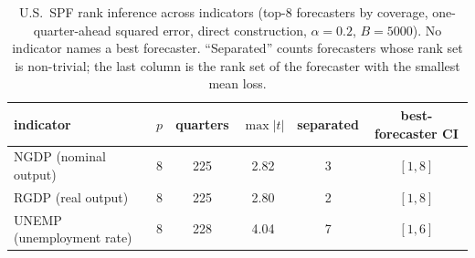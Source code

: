 \begin{table}[htb]
  \centering
  \caption[SPF rank inference across indicators]{U.S.\ SPF rank inference across
  indicators (top-8 forecasters by coverage, one-quarter-ahead squared error, direct
  construction, $\alpha=0.2$, $B=5000$). No indicator names a best forecaster.
  ``Separated'' counts forecasters whose rank set is non-trivial; the last column is the
  rank set of the forecaster with the smallest mean loss.}
  \label{tab:spf-indicators}
  \small
  \begin{tabular}{lccccc}
    \toprule
    indicator & $p$ & quarters & $\max|t|$ & separated & best-forecaster CI\\
    \midrule
    NGDP (nominal output)      & 8 & 225 & 2.82 & 3 & $[1,8]$\\
    RGDP (real output)         & 8 & 225 & 2.80 & 2 & $[1,8]$\\
    UNEMP (unemployment rate)  & 8 & 228 & 4.04 & 7 & $[1,6]$\\
    \bottomrule
  \end{tabular}
\end{table}
